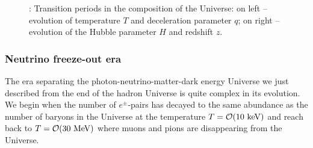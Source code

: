 \begin{figure}
\begin{minipage}{\linewidth}
\caption{: Transition periods in the composition of the Universe: on left -- evolution of temperature $T$ and deceleration parameter $q$; on right -- evolution of the Hubble parameter $H$ and redshift $z$. 
\label{fig:today} }
\end{minipage}
\end{figure}

\subsubsection{Neutrino freeze-out era} \label{nudecoup}
The era separating the photon-neutrino-matter-dark energy Universe we just described from the end of the hadron Universe is quite complex in its evolution. We begin when the number of $e^\pm$-pairs has decayed to the same abundance as the number of baryons in the Universe at the temperature $T=\mathcal{O}(10\text{ keV})$ and reach back to $T={\cal O}(30\MeV)$ where muons and pions are disappearing from the Universe.

